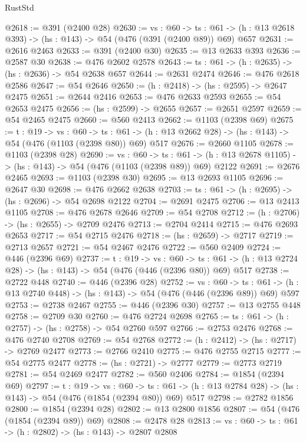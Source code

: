 \begin{lexlean}{RustStd}
\begin{coremodule}
@2618 := @391 (@2400 @28)
@2630 := {vs : @60} ->
  {ts : @61} -> (h : @13 @2618 @393) -> (hs : @143) -> @54 (@476 (@391 (@2400 @89)) @69) @657
@2631 := @2616 @2463
@2633 := @391 (@2400 @30)
@2635 := @13 @2633 @393
@2636 := @2587 @30
@2638 := @476 @2602 @2578
@2643 := {ts : @61} -> (h : @2635) -> (hs : @2636) -> @54 @2638 @657
@2644 := @2631 @2474
@2646 := @476 @2618 @2586
@2647 := @54 @2646
@2650 := (h : @2418) -> (hs : @2595) -> @2647 @2475
@2651 := @2644 @2416
@2653 := @476 @2633 @2593
@2655 := @54 @2653 @2475
@2656 := (hs : @2599) -> @2655
@2657 := @2651 @2597
@2659 := @54 @2465 @2475
@2660 := @560 @2413
@2662 := @1103 (@2398 @69)
@2675 := {t : @19} ->
  {vs : @60} ->
  {ts : @61} -> (h : @13 @2662 @28) -> (hs : @143) -> @54 (@476 (@1103 (@2398 @80)) @69) @517
@2676 := @2660 @1105
@2678 := @1103 (@2398 @28)
@2690 := {vs : @60} ->
  {ts : @61} -> (h : @13 @2678 @1105) -> (hs : @143) -> @54 (@476 (@1103 (@2398 @89)) @69) @2122
@2691 := @2676 @2465
@2693 := @1103 (@2398 @30)
@2695 := @13 @2693 @1105
@2696 := @2647 @30
@2698 := @476 @2662 @2638
@2703 := {ts : @61} -> (h : @2695) -> (hs : @2696) -> @54 @2698 @2122
@2704 := @2691 @2475
@2706 := @13 @2413 @1105
@2708 := @476 @2678 @2646
@2709 := @54 @2708
@2712 := (h : @2706) -> (hs : @2655) -> @2709 @2476
@2713 := @2704 @2414
@2715 := @476 @2693 @2653
@2717 := @54 @2715 @2476
@2718 := (hs : @2659) -> @2717
@2719 := @2713 @2657
@2721 := @54 @2467 @2476
@2722 := @560 @2409
@2724 := @446 (@2396 @69)
@2737 := {t : @19} ->
  {vs : @60} ->
  {ts : @61} -> (h : @13 @2724 @28) -> (hs : @143) -> @54 (@476 (@446 (@2396 @80)) @69) @517
@2738 := @2722 @448
@2740 := @446 (@2396 @28)
@2752 := {vs : @60} ->
  {ts : @61} -> (h : @13 @2740 @448) -> (hs : @143) -> @54 (@476 (@446 (@2396 @89)) @69) @597
@2753 := @2738 @2467
@2755 := @446 (@2396 @30)
@2757 := @13 @2755 @448
@2758 := @2709 @30
@2760 := @476 @2724 @2698
@2765 := {ts : @61} -> (h : @2757) -> (hs : @2758) -> @54 @2760 @597
@2766 := @2753 @2476
@2768 := @476 @2740 @2708
@2769 := @54 @2768
@2772 := (h : @2412) -> (hs : @2717) -> @2769 @2477
@2773 := @2766 @2410
@2775 := @476 @2755 @2715
@2777 := @54 @2775 @2477
@2778 := (hs : @2721) -> @2777
@2779 := @2773 @2719
@2781 := @54 @2469 @2477
@2782 := @560 @2406
@2784 := @1854 (@2394 @69)
@2797 := {t : @19} ->
  {vs : @60} ->
  {ts : @61} -> (h : @13 @2784 @28) -> (hs : @143) -> @54 (@476 (@1854 (@2394 @80)) @69) @517
@2798 := @2782 @1856
@2800 := @1854 (@2394 @28)
@2802 := @13 @2800 @1856
@2807 := @54 (@476 (@1854 (@2394 @89)) @69)
@2808 := @2478 @28
@2813 := {vs : @60} -> {ts : @61} -> (h : @2802) -> (hs : @143) -> @2807 @2808

\end{coremodule}
\end{lexlean}

